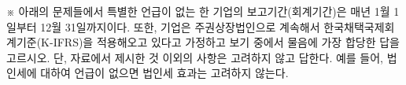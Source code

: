 \begin{framedtext}
※ 아래의 문제들에서 특별한 언급이 없는 한 기업의 보고기간(회계기간)은 매년 1월 1일부터 12월 31일까지이다. 또한, 기업은 주권상장법인으로 계속해서 한국채택국제회계기준(K-IFRS)을 적용해오고 있다고 가정하고 보기 중에서 물음에 가장 합당한 답을 고르시오. 단, 자료에서 제시한 것 이외의 사항은 고려하지 않고 답한다. 예를 들어, 법인세에 대하여 언급이 없으면 법인세 효과는 고려하지 않는다.
\end{framedtext}

